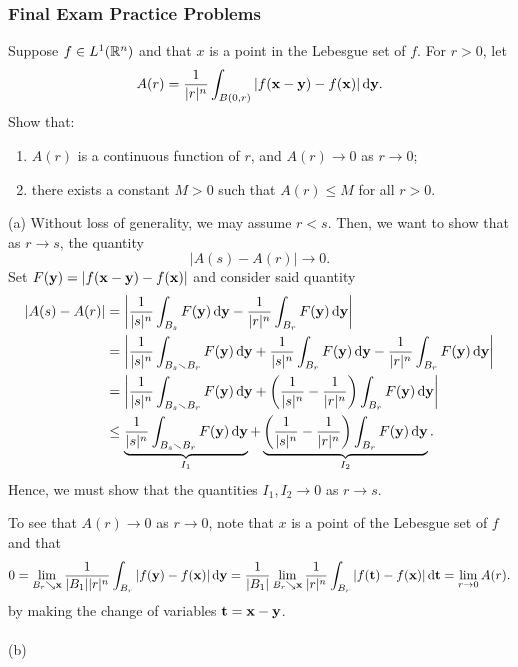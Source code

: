 \subsubsection{Final Exam Practice Problems}
\setcounter{exercise}{0}

\begin{problem}
Suppose $f\in L^1(\mathbb{R}^n)$ and that $x$ is a point in the Lebesgue set of
$f$. For $r>0$, let
\[
A(r)=\frac{1}{|r|^n}\int_{B(0,r)}|f(\mathbf{x}-\mathbf{y})-f(\mathbf{x})|\mathop{}\!\mathrm{d}\mathbf{y}.
\]
Show that:
\begin{enumerate}[label=(\alph*),noitemsep]
\item $A(r)$ is a continuous function of $r$, and $A(r)\to 0$ as $r\to 0$;
\item there exists a constant $M>0$ such that $A(r)\leq M$ for all $r>0$.
\end{enumerate}
\end{problem}
\begin{solution}
(a) Without loss of generality, we may assume $r<s$. Then, we want to show
that as $r\to s$, the quantity
\[
|A(s)-A(r)|\longrightarrow 0.
\]
Set $F(\mathbf{y})= |f(\mathbf{x}-\mathbf{y})-f(\mathbf{x})|$ and consider said quantity
\begin{align*}
|A(s)-A(r)|
&=\left|
\frac{1}{|s|^n}\int_{B_s}F(\bfy)\diff\bfy
-
\frac{1}{|r|^n}\int_{B_r}F(\bfy)\diff\bfy
\right|\\
&=\left|
\frac{1}{|s|^n}\int_{B_s\smallsetminus B_r}F(\bfy)\diff\bfy+
\frac{1}{|s|^n}\int_{B_r}F(\bfy)\diff\bfy-
\frac{1}{|r|^n}\int_{B_r}F(\bfy)\diff\bfy
\right|\\
&=\left|
\frac{1}{|s|^n}\int_{B_s\smallsetminus B_r}F(\bfy)\diff\bfy
+\left(\frac{1}{|s|^n}-\frac{1}{|r|^n}\right)\int_{B_r}F(\bfy)\diff\bfy
\right|\\
&\leq
\underbrace{\frac{1}{|s|^n}\int_{B_s\smallsetminus B_r}F(\bfy)\diff\bfy}_{I_1}
+\underbrace{\left(\frac{1}{|s|^n}-\frac{1}{|r|^n}\right)\int_{B_r}F(\bfy)\diff\bfy}_{I_2}.
\end{align*}
Hence, we must show that the quantities $I_1,I_2\to 0$ as $r\to s$.

To see that $A(r)\to 0$ as $r\to 0$, note that $x$ is a point of the
Lebesgue set of $f$ and that
\[
0=\lim_{B_r\searrow\mathbf{x}}\frac{1}{|B_1||r|^n}\int_{B_r}|f(\mathbf{y})-f(\mathbf{x})|\mathop{}\!\mathrm{d}\mathbf{y}=\frac{1}{|B_1|}\lim_{B_r\searrow\mathbf{x}}\frac{1}{|r|^n}\int_{B_r}|f(\mathbf{t})-f(\mathbf{x})|\mathop{}\!\mathrm{d}\mathbf{t}=\lim_{r\to
0}A(r).
\]
by making the change of variables $\mathbf{t}=\mathbf{x}-\mathbf{y}$.
\\\\
(b)
\end{solution}

